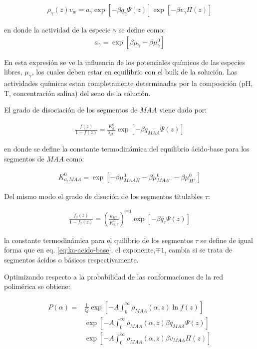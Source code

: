 \begin{align}
	\rho_\gamma(z)v_w = a_\gamma \exp\left[-\beta q_\gamma\Psi(z)\right] \exp\left[-\beta v_\gamma\Pi(z)\right]
	\label{eq:film:free-species}
\end{align}

\noindent en donde la actividad de la especie $\gamma$ se define como:
\begin{align}
	a_\gamma = \exp[\beta\mu_\gamma - \beta\mu^0_\gamma]
\end{align}

En esta expresi\'on se ve la influencia de los potenciales qu\'imicos de las especies libres,  $\mu_\gamma$, los cuales  deben estar en equilibrio con el bulk de la soluci\'on. Las actividades qu\'imicas estan completamente determinadas por la composici\'on (pH, T, concentraci\'on salina) del seno de la soluci\'on.
 
El grado de disociaci\'on de los segmentos de $MAA$ viene dado por:

\begin{align}
	\frac{f(z)}{1-f(z)} = \frac{K^0_a}{a_{H^+}} \exp[-\beta q_{MAA}\Psi(z)]
	\label{eq:film:degree-film}
\end{align}

\noindent en donde se define la constante termodin\'amica del equilibrio \'acido-base para los segmentos de $MAA$ como:

\begin{align}
	K_{a,MAA}^0 = \exp[-\beta\mu^0_{MAAH} -\beta\mu^0_{MAA^-} -\beta\mu^0_{H^+}]
	\label{eq:ka-acido-base}
\end{align}

Del mismo modo el grado de disoci\'on de los segmentos titulables $\tau$:

\begin{align}
	\frac{f_\tau(z)}{1-f_\tau(z)} = \left(\frac{a_{H^+}}{K^0_{a,\tau}}\right)^{\mp 1} \exp[-\beta q_\tau \Psi(z)]
	\label{eq:film:degree-protein}
\end{align}


\noindent la constante termodin\'amica para el quilibrio de los segmentos $\tau$ se define de igual forma que en eq. \ref{eq:ka-acido-base}. el exponente,$\mp 1$, cambia si se trata de segmentos \'acidos o b\'asicos respectivamente.

Optimizando respecto a la probabilidad de las conformaciones de la red polim\'erica se obtiene:

\begin{align}
	\begin{aligned}
	P(\alpha) = &\frac{1}{Q}\exp\left[ -A \int^\infty_0 \rho_{MAA}(\alpha, z) \ln f(z)\right] \\
	&\exp\left[ -A \int^\infty_0 \rho_{MAA}(\alpha, z) \beta q_{MAA} \Psi(z)\right] \\
	& \exp\left[ -A \int^\infty_0 \rho_{MAA}(\alpha, z) \beta v_{MAA} \Pi(z)\right] 
	\end{aligned}
	\label{eq:film:probabilidad}
\end{align}

